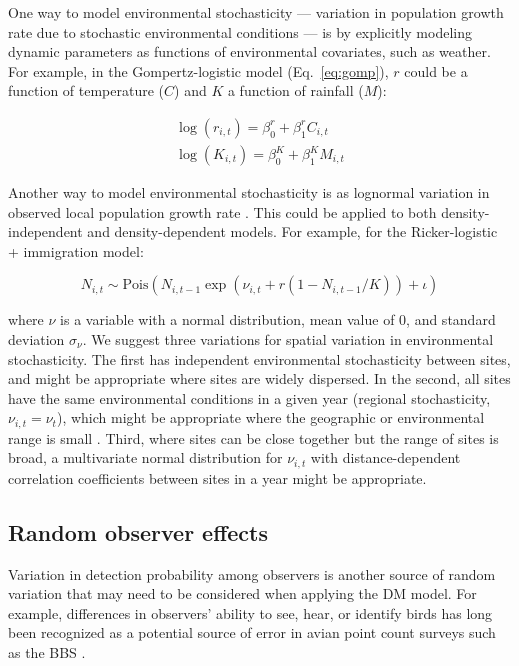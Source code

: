 \documentclass[12pt,english]{article}
\begin{document}
\begin{spacing}{1.9}
\begin{flushleft}
One way to model environmental stochasticity --- variation in population growth
rate due to stochastic environmental conditions --- is by explicitly
modeling dynamic parameters as functions of environmental covariates, such
as weather.  For example, in the Gompertz-logistic model (Eq.~\ref{eq:gomp}), $r$ could be a 
function of temperature ($C$) and $K$ a function of rainfall ($M$):
\begin{linenomath*}
\begin{gather}
\log(r_{i,t}) = \beta^{r}_{0} + \beta^{r}_{1}C_{i,t} \nonumber \\
\log(K_{i,t}) = \beta^{K}_{0} + \beta^{K}_{1}M_{i,t}  
\label{eq:weather}
\end{gather}
\end{linenomath*}

Another way to model environmental stochasticity is as lognormal variation in observed local population 
growth rate \citep{bjornstad:2001,bonsall_hastings:2004}.  This could be applied to both density-independent and density-dependent models.
For example, for the Ricker-logistic + immigration model:
\begin{linenomath*}
\begin{equation}
N_{i,t} \sim
\mathrm{Pois}(N_{i,t-1}\exp(\nu_{i,t} + r(1-N_{i,t-1}/K)) + \iota)
\label{eq:nuRand}
\end{equation}
\end{linenomath*}
where $\nu$ is a variable with a normal distribution, mean value of 0, and standard deviation $\sigma_\nu$.  
We suggest three variations for spatial variation in environmental stochasticity.  The first has independent environmental stochasticity 
between sites, and might be appropriate where sites are widely dispersed.  In the second, 
all sites have the same environmental conditions in a given year (regional stochasticity, $\nu_{i,t} = \nu_{t}$),
which might be appropriate where the geographic or environmental range is small \citep{hanski:1998}.  
Third, where sites can be close together but the range of sites is broad, a multivariate normal distribution 
for $\nu_{i,t}$ with distance-dependent correlation coefficients 
between sites in a year might be appropriate.

\subsection*{Random observer effects}

Variation in detection probability among observers is another
source of random variation that may need to be considered when applying
the DM model. For example, differences in observers' ability to see,
hear, or identify birds has long been recognized as a potential source of error
in avian point count surveys such as the BBS 
\citep{robbins_etal:1986,sauer_etal:1994auk,campbell_francis:2011}.


\end{flushleft}
\end{spacing}
\end{document}
